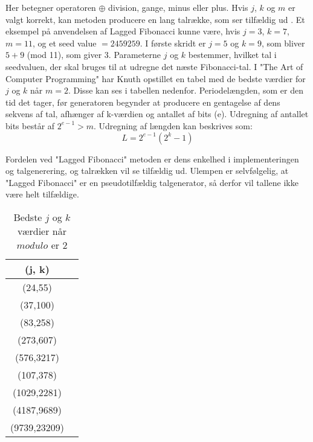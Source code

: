 \noindent Her betegner operatoren $\oplus$ division, gange, minus eller plus. Hvis $j$, $k$ og $m$ er valgt korrekt, kan metoden producere en lang talrække, som ser tilfældig ud \cite{RNGMonteCarlo}.
\noindent Et eksempel på anvendelsen af Lagged Fibonacci kunne være, hvis $j = 3$, $k = 7$, $m = 11$, og et seed value $= 2459259$. I første skridt er $j=5$ og $k=9$, som bliver $5+9$ (mod 11), som giver $3$. Parameterne $j$ og $k$ bestemmer, hvilket tal i seedvaluen, der skal bruges til at udregne det næste Fibonacci-tal.
\noindent I "The Art of Computer Programming" \cite{Knuth1998} har Knuth opstillet en tabel med de bedste værdier for $j$ og $k$ når $m = 2$. Disse kan ses i tabellen nedenfor. Periodelængden, som er den tid det tager, før generatoren begynder at producere en gentagelse af dens sekvens af tal, afhænger af k-værdien og antallet af bits (e). Udregning af antallet bits består af $2^{e-1}>m$. Udregning af længden kan beskrives som:
$$L = 2^{e-1}(2^k - 1)$$

\noindent Fordelen ved "Lagged Fibonacci" metoden er dens enkelhed i implementeringen og talgenerering, og talrækken vil se tilfældig ud. Ulempen er selvfølgelig, at "Lagged Fibonacci" er en pseudotilfældig talgenerator, så derfor vil tallene ikke være helt tilfældige.
\begin{table}[h]
    \centering
    \caption{Bedste $j$ og $k$ værdier når $modulo$ er $2$}
    \begin{tabular}{|c|c|}
    \hline
    (j, k) \\
    \hline
    (24,55) \\
    (37,100) \\
    (83,258) \\
    (273,607) \\
    (576,3217) \\
    (107,378) \\
    (1029,2281) \\
    (4187,9689) \\
    (9739,23209) \\
    \hline
    \end{tabular}
    \end{table}



